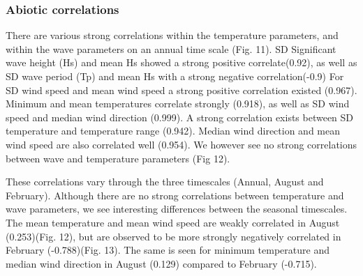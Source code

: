 \documentclass[10pt,a4,]{article}
\begin{document}
\hypertarget{abiotic-correlations}{%
\subsubsection{Abiotic correlations}\label{abiotic-correlations}}

There are various strong correlations within the temperature parameters,
and within the wave parameters on an annual time scale (Fig. 11). SD
Significant wave height (Hs) and mean Hs showed a strong positive
correlate(0.92), as well as SD wave period (Tp) and mean Hs with a
strong negative correlation(-0.9) For SD wind speed and mean wind speed
a strong positive correlation existed (0.967). Minimum and mean
temperatures correlate strongly (0.918), as well as SD wind speed and
median wind direction (0.999). A strong correlation exists between SD
temperature and temperature range (0.942). Median wind direction and
mean wind speed are also correlated well (0.954). We however see no
strong correlations between wave and temperature parameters (Fig 12).

These correlations vary through the three timescales (Annual, August and
February). Although there are no strong correlations between temperature
and wave parameters, we see interesting differences between the seasonal
timescales. The mean temperature and mean wind speed are weakly
correlated in August (0.253)(Fig. 12), but are observed to be more
strongly negatively correlated in February (-0.788)(Fig. 13). The same
is seen for minimum temperature and median wind direction in August
(0.129) compared to February (-0.715).
\end{document}
